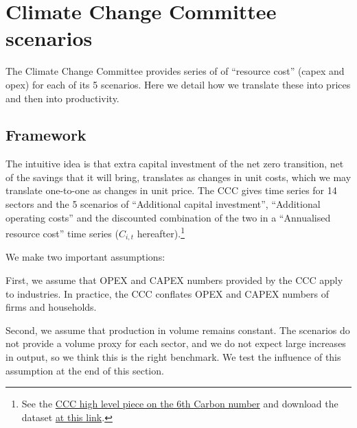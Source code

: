 \section{Climate Change Committee scenarios}
\label{appendix:ccc_scenarios}

The Climate Change Committee \citep{cccSixthCarbonBudget2020} provides series of of ``resource cost'' (capex and opex) for each of its 5 scenarios. Here we detail how we translate these into prices and then into productivity. 


\subsection{Framework}

The intuitive idea is that extra capital investment of the net zero transition, net of the savings that it will bring, translates as changes in unit costs, which we may translate one-to-one as changes in unit price. The CCC gives time series for 14 sectors and the 5 scenarios of ``Additional capital investment'', ``Additional operating costs'' and the discounted combination of the two in a ``Annualised resource cost'' time series ($C_{i,t}$ hereafter).\footnote{See the \href{https://www.theccc.org.uk/2021/02/01/the-numbers-behind-the-budget-six-ways-to-explore-the-sixth-carbon-budget-dataset/}{CCC high level piece on the 6th Carbon number} and download the dataset \href{https://www.theccc.org.uk/wp-content/uploads/2021/02/The-Sixth-Carbon-Budget-Dataset.xlsx}{at this link}.}

We make two important assumptions:

First, we assume that OPEX and CAPEX numbers provided by the CCC apply to industries. In practice, the CCC conflates OPEX and CAPEX numbers of firms and households.

Second, we assume that production in volume remains constant. The scenarios do not provide a volume proxy for each sector, and we do not expect large increases in output, so we think this is the right benchmark. We test the influence of this assumption at the end of this section.

